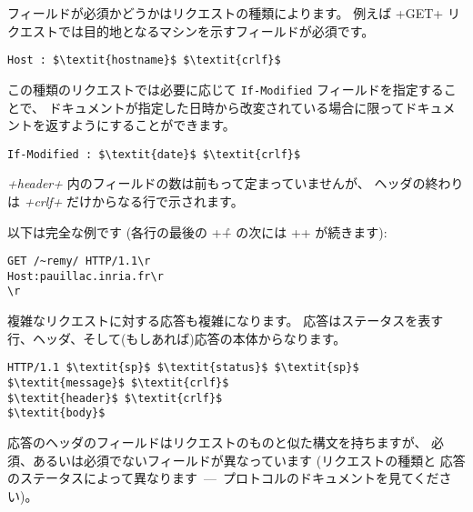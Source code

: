 フィールドが必須かどうかはリクエストの種類によります。
例えば \ml+GET+ リクエストでは目的地となるマシンを示すフィールドが必須です。
%
\begin{lstlisting}
Host : $\textit{hostname}$ $\textit{crlf}$
\end{lstlisting}
%
この種類のリクエストでは必要に応じて \texttt{If-Modified} フィールドを指定することで、
ドキュメントが指定した日時から改変されている場合に限ってドキュメントを返すようにすることができます。
%
\begin{lstlisting}
If-Modified : $\textit{date}$ $\textit{crlf}$
\end{lstlisting}
%
\textit{\ml+header+} 内のフィールドの数は前もって定まっていませんが、
ヘッダの終わりは \textit{\ml+crlf+} だけからなる行で示されます。

以下は完全な例です (各行の最後の \ml+\r+ の次には \ml+\n+ が続きます):
%
\begin{lstlisting}
GET /~remy/ HTTP/1.1\r
Host:pauillac.inria.fr\r
\r
\end{lstlisting}
%
複雑なリクエストに対する応答も複雑になります。
応答はステータスを表す行、ヘッダ、そして(もしあれば)応答の本体からなります。
%
\begin{lstlisting}
HTTP/1.1 $\textit{sp}$ $\textit{status}$ $\textit{sp}$ $\textit{message}$ $\textit{crlf}$
$\textit{header}$ $\textit{crlf}$
$\textit{body}$
\end{lstlisting}
%
応答のヘッダのフィールドはリクエストのものと似た構文を持ちますが、
必須、あるいは必須でないフィールドが異なっています (リクエストの種類と
応答のステータスによって異なります~---~プロトコルのドキュメントを見てください)。

